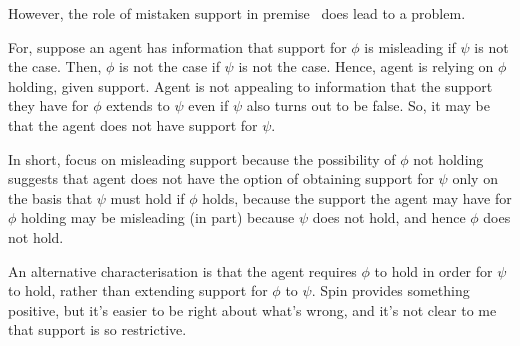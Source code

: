 \begin{note}[For \nI{}]
  However, the role of mistaken support in premise~\nI{} does lead to a problem.

  For, suppose an agent has information that support for \(\phi\) is misleading if \(\psi\) is not the case.
  Then, \(\phi\) is not the case if \(\psi\) is not the case.
  Hence, agent is relying on \(\phi\) holding, given support.
  Agent is not appealing to information that the support they have for \(\phi\) extends to \(\psi\) even if \(\psi\) also turns out to be false.
  So, it may be that the agent does not have support for \(\psi\).

  In short, focus on misleading support because the possibility of \(\phi\) not holding suggests that agent does not have the option of obtaining support for \(\psi\) only on the basis that \(\psi\) must hold if \(\phi\) holds, because the support the agent may have for \(\phi\) holding may be misleading (in part) because \(\psi\) does not hold, and hence \(\phi\) does not hold.

  An alternative characterisation is that the agent requires \(\phi\) to hold in order for \(\psi\) to hold, rather than extending support for \(\phi\) to \(\psi\).
  Spin provides something positive, but it's easier to be right about what's wrong, and it's not clear to me that support is so restrictive.
\end{note}


